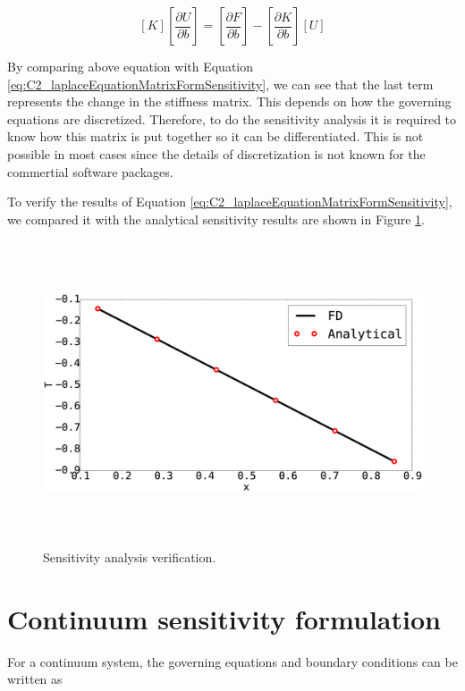 \begin{equation*}
	\left[ K \right] \left[ \frac{\partial U}{\partial b} \right] = 
	\left[ \frac{\partial F}{\partial b} \right] - 
		\left[ \frac{\partial K}{\partial b} \right] \left[ U \right]
\end{equation*}

By comparing above equation with Equation \eqref{eq:C2_laplaceEquationMatrixFormSensitivity}, we can see that the last term represents the change in the stiffness matrix. This depends on how the governing equations are discretized. Therefore, to do the sensitivity analysis it is required to know how this matrix is put together so it can be differentiated. This is not possible in most cases since the details of discretization is not known for the commertial software packages.

To verify the results of Equation \eqref{eq:C2_laplaceEquationMatrixFormSensitivity}, we compared it with the analytical sensitivity results are shown in Figure \ref{fig:C2_discreteSensitivityVerification}.

\begin{figure}
	\centering
	\includegraphics[height=9.00cm]{Chapter_2/figure/SA_finitedifference_vs_analytical.eps}
	\caption{Sensitivity analysis verification.}
	\label{fig:C2_discreteSensitivityVerification}
\end{figure}

\section{Continuum sensitivity formulation}
For a continuum system, the governing equations and boundary conditions can be written as

